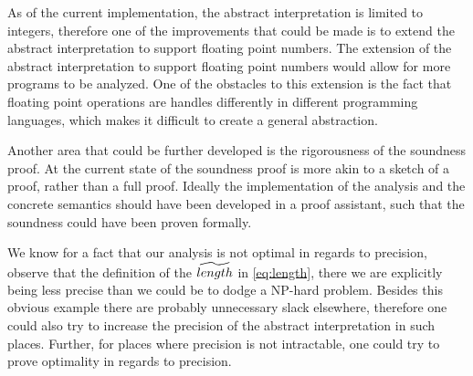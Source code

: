 As of the current implementation, the abstract interpretation is limited to integers, therefore one of the improvements that could be made is to extend the abstract interpretation to support floating point numbers.
The extension of the abstract interpretation to support floating point numbers would allow for more programs to be analyzed.
One of the obstacles to this extension is the fact that floating point operations are handles differently in different programming languages, which makes it difficult to create a general abstraction.


Another area that could be further developed is the rigorousness of the soundness proof.
At the current state of the soundness proof is more akin to a sketch of a proof, rather than a full proof.
Ideally the implementation of the analysis and the concrete semantics should have been developed in a proof assistant, such that the soundness could have been proven formally.


We know for a fact that our analysis is not optimal in regards to precision, observe that the definition of the $\widetilde{length}$ in \autoref{eq:length}, there we are explicitly being less precise than we could be to dodge a NP-hard problem.
Besides this obvious example there are probably unnecessary slack elsewhere, therefore one could also try to increase the precision of the abstract interpretation in such places.
Further, for places where precision is not intractable, one could try to prove optimality in regards to precision.

